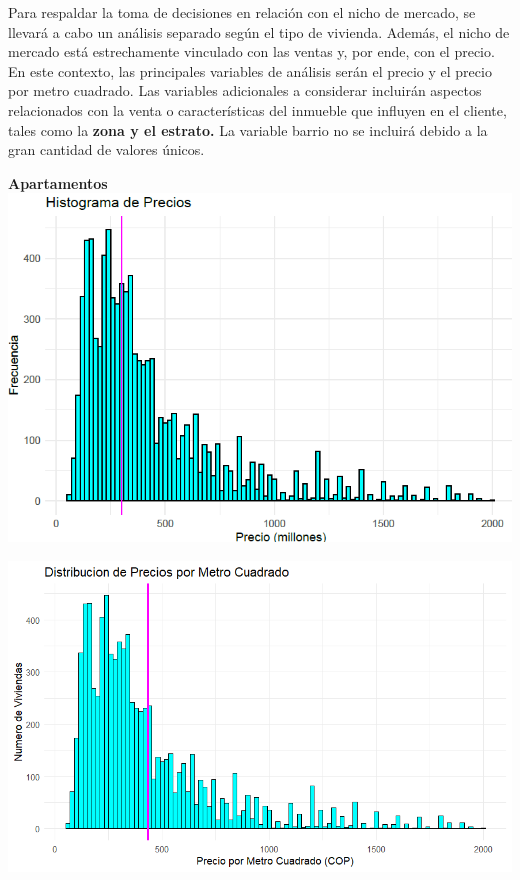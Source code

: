 \documentclass[conference,final,]{IEEEtran}
\begin{document}
Para respaldar la toma de decisiones en relación con el nicho de
mercado, se llevará a cabo un análisis separado según el tipo de
vivienda. Además, el nicho de mercado está estrechamente vinculado con
las ventas y, por ende, con el precio. En este contexto, las principales
variables de análisis serán el precio y el precio por metro cuadrado.
Las variables adicionales a considerar incluirán aspectos relacionados
con la venta o características del inmueble que influyen en el cliente,
tales como la \textbf{zona y el estrato.} La variable barrio no se
incluirá debido a la gran cantidad de valores únicos.\\

\newpage

\textbf{Apartamentos}\\

\includegraphics[width=1\linewidth]{images/HistogramaPrecios}

\includegraphics[width=1\linewidth]{images/DistrPreciosMetroCuadrado}
\end{document}
